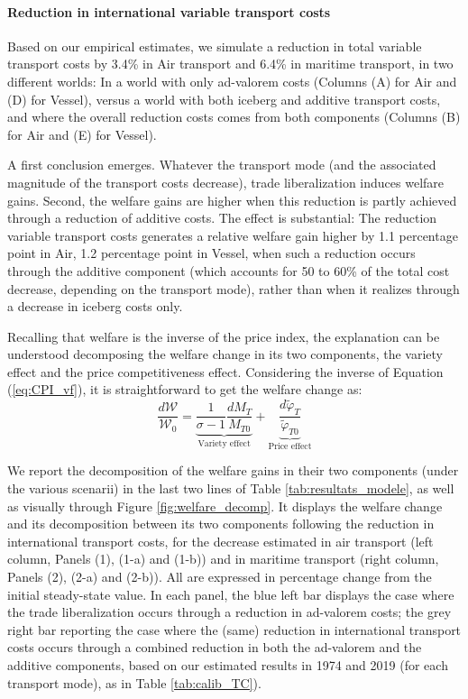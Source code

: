 \documentclass[a4paper,11pt]{article}
\begin{document}
\paragraph{Reduction in international variable transport costs} Based on our empirical estimates, we simulate a reduction in total variable transport costs by 3.4\% in Air transport and 6.4\% in maritime transport, in two different worlds: In a world with only ad-valorem costs (Columns (A) for Air and (D) for Vessel), versus a world with both iceberg and additive transport costs, and where the overall reduction costs comes from both components (Columns (B) for Air and (E) for Vessel).

A first conclusion emerges. Whatever the transport mode (and the associated magnitude of the transport costs decrease), trade liberalization induces welfare gains. Second, the welfare gains are higher when this reduction is partly achieved through a reduction of additive costs. The effect is substantial: The reduction variable transport costs generates a relative welfare gain higher by 1.1 percentage point in Air, 1.2 percentage point in Vessel, when such a reduction occurs through the additive component (which accounts for 50 to 60\% of the total cost decrease, depending on the transport mode), rather than when it realizes through a decrease in iceberg costs only.\smallskip

Recalling that welfare is the inverse of the price index, the explanation can be understood decomposing the welfare change in its two components, the variety effect and the price competitiveness effect. Considering the inverse of Equation (\ref{eq:CPI_vf}), it is straightforward to get the welfare change as:
\begin{equation}
\frac{d\mathcal{W}}{\mathcal{W}_0} = \underbrace{\frac{1}{\sigma-1} \frac{d M_T}{M_{T0}}}_{\text{Variety effect}} +  \underbrace{\frac{d\widetilde{\varphi}_T}{\widetilde{\varphi}_{T0}}}_{\text{Price effect}} \label{eq:decompWelfare}
\end{equation}

We report the decomposition of the welfare gains in their two components (under the various scenarii) in the last two lines of Table \ref{tab:resultats_modele}, as well as visually through Figure \ref{fig:welfare_decomp}. It displays the welfare change and its decomposition between its two components following the reduction in international transport costs, for the decrease estimated in air transport (left column, Panels (1), (1-a) and (1-b)) and in maritime transport (right column, Panels (2), (2-a) and (2-b)). All are expressed in percentage change from the initial steady-state value. In each panel, the blue left bar displays the case where the trade liberalization occurs through a reduction in ad-valorem costs; the grey right bar reporting the case where the (same) reduction in international transport costs occurs through a combined reduction in both the ad-valorem and the additive components, based on our estimated results in 1974 and 2019 (for each transport mode), as in Table \ref{tab:calib_TC}).
\end{document}
